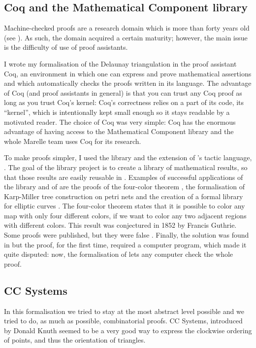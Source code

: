 \documentclass[a4paper,10pt]{article}
\begin{document}
\subsection{Coq and the Mathematical Component library}

Machine-checked proofs are a research domain which is more than forty years old (see \cite{Automath}). As such, the domain acquired a certain maturity; however, the main issue is the difficulty of use of proof assistants.

I wrote my formalisation of the Delaunay triangulation in the proof assistant {\sc Coq}, an environment in which one can express and prove mathematical assertions and which automatically checks the proofs written in its language. The advantage of {\sc Coq} (and proof assistants in general) is that you can trust any {\sc Coq} proof as long as you trust {\sc Coq}'s kernel: {\sc Coq}'s correctness relies on a part of its code, its ``kernel'', which is intentionally kept small enough so it stays readable by a motivated reader. The choice of {\sc Coq} was very simple: {\sc Coq} has the enormous advantage of having access to the {\sc Mathematical Component} library and the whole Marelle team uses {\sc Coq} for its research.

To make proofs simpler, I used the {} library and the extension of {}'s tactic language, {}. The goal of the {} library project is to create a library of mathematical results, so that those results are easily reusable in {}. Examples of successful applications of the {} library and of {} are the proofs of the four-color theorem \cite{Gonthier08}, the formalisation of Karp-Miller tree construction on petri nets \cite{petri} and the creation of a formal library for elliptic curves \cite{elliptic}. The four-color theorem states that it is possible to color any map with only four different colors, if we want to color any two adjacent regions with different colors. This result was conjectured in 1852 by Francis Guthrie. Some proofs were published, but they were false \cite{falseproof}. Finally, the solution was found in \cite{proof4} but the proof, for the first time, required a computer program, which made it quite disputed: now, the formalisation of \cite{Gonthier08} lets any computer check the whole proof.

\subsection{CC Systems}
\label{CC}
In this formalisation we tried to stay at the most abstract level possible and we tried to do, as much as possible, combinatorial proofs. CC Systems, introduced by Donald Knuth \cite{Knuth92} seemed to be a very good way to express the clockwise ordering of points, and thus the orientation of triangles.
\end{document}
